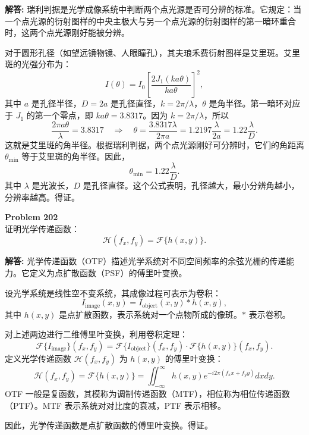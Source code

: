 \documentclass[12pt, a4paper, oneside]{ctexart}
\newenvironment{solution}{\par\noindent\textbf{解答:}\quad}{\par}
\begin{document}
\begin{solution}
    瑞利判据是光学成像系统中判断两个点光源是否可分辨的标准。它规定：当一个点光源的衍射图样的中央主极大与另一个点光源的衍射图样的第一暗环重合时，这两个点光源刚好能被分辨。

    对于圆形孔径（如望远镜物镜、人眼瞳孔），其夫琅禾费衍射图样是艾里斑。艾里斑的光强分布为：
    \[
    I(\theta) = I_0 \left[ \frac{2 J_1(k a \theta)}{k a \theta} \right]^2,
    \]
    其中 $a$ 是孔径半径，$D = 2a$ 是孔径直径，$k = 2\pi/\lambda$，$\theta$ 是角半径。第一暗环对应于 $J_1$ 的第一个零点，即 $k a \theta = 3.8317$。因为 $k = 2\pi/\lambda$，所以
    \[
    \frac{2\pi a \theta}{\lambda} = 3.8317 \quad \Rightarrow \quad \theta = \frac{3.8317 \lambda}{2\pi a} = 1.2197 \frac{\lambda}{2a} = 1.22 \frac{\lambda}{D}.
    \]
    这就是艾里斑的角半径。根据瑞利判据，两个点光源刚好可分辨时，它们的角距离 $\theta_{\min}$ 等于艾里斑的角半径。因此，
    \[
    \theta_{\min} = 1.22 \frac{\lambda}{D}.
    \]
    其中 $\lambda$ 是光波长，$D$ 是孔径直径。这个公式表明，孔径越大，最小分辨角越小，分辨率越高。得证。
\end{solution}

\begin{mdframed}[backgroundcolor=gray!10, linewidth=0pt]
    \textbf{Problem 202} \\
    证明光学传递函数：
    \[
    \mathcal{H}(f_x, f_y) = \mathcal{F} \{ h(x,y) \}.
    \]
\end{mdframed}
\begin{solution}
    光学传递函数（OTF）描述光学系统对不同空间频率的余弦光栅的传递能力。它定义为点扩散函数（PSF）的傅里叶变换。

    设光学系统是线性空不变系统，其成像过程可表示为卷积：
    \[
    I_{\text{image}}(x,y) = I_{\text{object}}(x,y) \ast h(x,y),
    \]
    其中 $h(x,y)$ 是点扩散函数，表示系统对一个点物所成的像斑。$\ast$ 表示卷积。

    对上述两边进行二维傅里叶变换，利用卷积定理：
    \[
    \mathcal{F}\{I_{\text{image}}\}(f_x, f_y) = \mathcal{F}\{I_{\text{object}}\}(f_x, f_y) \cdot \mathcal{F}\{h(x,y)\}(f_x, f_y).
    \]
    定义光学传递函数 $\mathcal{H}(f_x, f_y)$ 为 $h(x,y)$ 的傅里叶变换：
    \[
    \mathcal{H}(f_x, f_y) = \mathcal{F} \{ h(x,y) \} = \iint_{-\infty}^{\infty} h(x,y) e^{-i 2\pi (f_x x + f_y y)} dx dy.
    \]
    OTF 一般是复函数，其模称为调制传递函数（MTF），相位称为相位传递函数（PTF）。MTF 表示系统对对比度的衰减，PTF 表示相移。

    因此，光学传递函数是点扩散函数的傅里叶变换。得证。
\end{solution}
\end{document}

